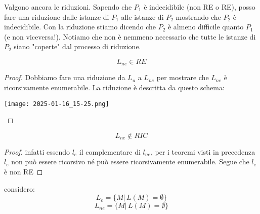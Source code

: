 	Valgono ancora le riduzioni. Sapendo che $P_1$ è indecidibile (non RE o RE), posso fare una riduzione
	dalle istanze di $P_1$  alle istanze di $P_2$ mostrando che $P_2$ è indecidibile.
	Con la riduzione stiamo dicendo che $P_2$ è almeno difficile quanto $P_1$  (e non viceversa!).
	Notiamo che non è nemmeno necessario che tutte le istanze di $P_2$  siano "coperte" dal processo di
riduzione.
\begin{theorem}
	$$L_{ne}\in RE$$
\end{theorem}
\begin{proof}
	Dobbiamo fare una riduzione da $L_u$ a $L_{ne}$ per mostrare che $L_{ne}$ è ricorsivamente enumerabile.
	La riduzione è descritta da questo schema:
	\begin{center}
			\texttt{[image: 2025-01-16\_15-25.png]}
	\end{center}
\end{proof}
\begin{theorem}
	$$L_{ne}\not\in RIC$$
\end{theorem}
\begin{proof}
	infatti essendo $l_e$ il complementare di $l_{ne}$, per i teoremi visti in precedenza  $l_e$ non può essere ricorsivo
	né può essere ricorsivamente enumerabile. Segue che  $l_e$ è non RE
\end{proof}
\begin{example}
	considero:
	$$L_e=\{M|\,L(M)=\emptyset\}$$
	$$L_{ne}=\{M|\,L(M)=\emptyset\}$$
\end{example}

